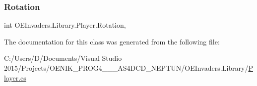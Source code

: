 \subsubsection{\texorpdfstring{Rotation}{Rotation}}
{\footnotesize\ttfamily int O\+E\+Invaders.\+Library.\+Player.\+Rotation\hspace{0.3cm}{\ttfamily [get]}, {\ttfamily [set]}}



The documentation for this class was generated from the following file\+:\begin{DoxyCompactItemize}
\item 
C\+:/\+Users/\+D/\+Documents/\+Visual Studio 2015/\+Projects/\+O\+E\+N\+I\+K\+\_\+\+P\+R\+O\+G4\+\_\+\_\+\_\+\+A\+S4\+D\+C\+D\+\_\+\+N\+E\+P\+T\+U\+N/\+O\+E\+Invaders.\+Library/\mbox{\hyperlink{_player_8cs}{Player.\+cs}}\end{DoxyCompactItemize}
